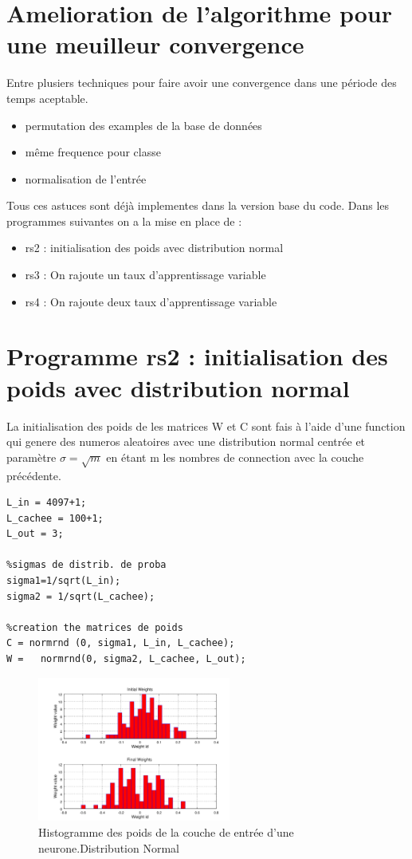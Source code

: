 \documentclass[journal]{IEEEtran}
\begin{document}
\section{Amelioration de l'algorithme pour une meuilleur convergence}
Entre plusiers techniques pour faire avoir une convergence dans une période des temps aceptable.
\begin{itemize}
	\item permutation des examples de la base de données
	\item même frequence pour classe
	\item normalisation de l'entrée
\end{itemize}
Tous ces astuces sont déjà implementes dans la version base du code. Dans les programmes suivantes on
a la mise en place de :
\begin{itemize}
	\item rs2 : initialisation des poids avec distribution normal
	\item rs3 : On rajoute un taux d'apprentissage variable
	\item rs4 : On rajoute deux taux d'apprentissage variable
\end{itemize}

\section{Programme rs2 : initialisation des poids avec distribution normal}\blindtext

La initialisation des poids de les matrices W et C sont fais à l'aide d'une function qui genere
des numeros aleatoires avec une distribution normal centrée et paramètre $ \sigma=\sqrt{m} $
en étant m les nombres de connection avec la couche précédente.
\begin{lstlisting}
L_in = 4097+1;
L_cachee = 100+1;
L_out = 3;

%sigmas de distrib. de proba
sigma1=1/sqrt(L_in);
sigma2 = 1/sqrt(L_cachee);

%creation the matrices de poids
C = normrnd (0, sigma1, L_in, L_cachee);
W =   normrnd(0, sigma2, L_cachee, L_out);	
\end{lstlisting}


\begin{figure}[h]
	\centering
	\includegraphics[width=2.5in]{../OctaveNeurons/rs22}
	\caption{Histogramme des poids de la couche de entrée d'une neurone.Distribution Normal }
\label{fig:histoW}
\end{figure}
\blindtext
\end{document}
